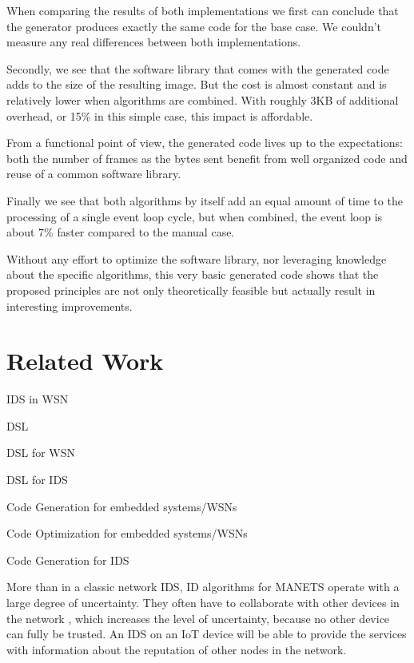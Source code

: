 \documentclass[conference]{IEEEtran}
\begin{document}
When comparing the results of both implementations we first can conclude that
the generator produces exactly the same code for the base case. We couldn't
measure any real differences between both implementations.

Secondly, we see that the software library that comes with the generated code
adds to the size of the resulting image. But the cost is almost constant and is
relatively lower when algorithms are combined. With roughly 3KB of additional
overhead, or 15\% in this simple case, this impact is affordable.

From a functional point of view, the generated code lives up to the
expectations: both the number of frames as the bytes sent benefit from well
organized code and reuse of a common software library.

Finally we see that both algorithms by itself add an equal amount of time to
the processing of a single event loop cycle, but when combined, the event loop
is about 7\% faster compared to the manual case.

Without any effort to optimize the software library, nor leveraging knowledge
about the specific algorithms, this very basic generated code shows that the
proposed principles are not only theoretically feasible but actually result in
interesting improvements.

\section{Related Work}
\label{related}

IDS in WSN \cite{perrig2004security,mishra2004intrusion}

DSL \cite{fowler2010domain,mernik2005and}

DSL for WSN \cite{naumowicz2009prototyping,levis2004tinyscript}

DSL for IDS \cite{eckmann2002statl}

Code Generation for embedded systems/WSNs \cite{leupers2000code,marwedel2002code}

Code Optimization for embedded systems/WSNs \cite{panda2001data,naik2001software}

Code Generation for IDS \cite{charitakis2003code}


More than in a classic network IDS, ID algorithms for MANETS operate with a
large degree of uncertainty. They often have to collaborate with other devices
in the network \cite{marchang2008collaborative,krontiris2009cooperative}, which
increases the level of uncertainty, because no other device can fully be
trusted. An IDS on an IoT device will be able to provide the services with
information about the reputation \cite{ganeriwal2008reputation} of other nodes
in the network.
\end{document}
